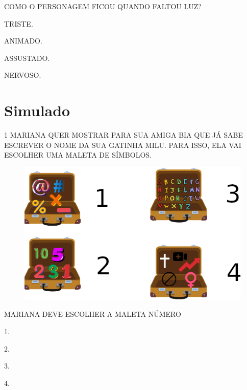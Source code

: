 COMO O PERSONAGEM FICOU QUANDO FALTOU LUZ?

\begin{escolha}[itemsep=-5pt]
\item TRISTE.

\item ANIMADO.

\item ASSUSTADO.

\item NERVOSO.
\end{escolha}

\chapter[Simulado 2]{Simulado}

\pagebreak

\num{1} MARIANA QUER MOSTRAR PARA SUA AMIGA BIA QUE JÁ SABE ESCREVER O NOME DA SUA GATINHA MILU. PARA ISSO, ELA VAI ESCOLHER UMA MALETA DE SÍMBOLOS. 

\begin{figure}[H]
\includegraphics[width=\textwidth]{media/image209.png}
\end{figure}

MARIANA DEVE ESCOLHER A MALETA NÚMERO

\begin{multicols}{4}
\begin{escolha}[itemsep=0pt]
\item 1.

\item 2.

\item 3.

\item 4.
\end{escolha}
\end{multicols}

